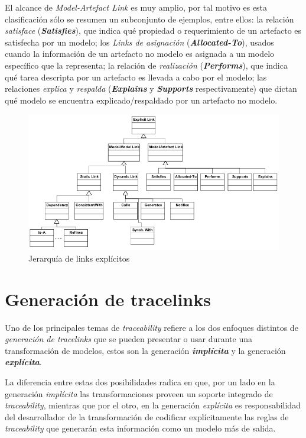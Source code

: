 \documentclass[a4paper,12pt,oneside,spanish]{book}
\begin{document}
El alcance de \textit{Model-Artefact Link} es muy amplio, por tal motivo es esta clasificación sólo se resumen un subconjunto de ejemplos, entre ellos: la relación \textit{satisface} (\textit{\textbf{Satisfies}}), que indica qué propiedad o requerimiento de un artefacto es satisfecha por un modelo; los \textit{Links de asignación} (\textit{\textbf{Allocated-To}}), usados cuando la información de un artefacto no modelo es asignada a un modelo específico que la representa; la relación de \textit{realización} (\textit{\textbf{Performs}}), que indica qué tarea descripta por un artefacto es llevada a cabo por el modelo; las relaciones \textit{explica} y \textit{respalda} (\textit{\textbf{Explains}} y \textit{\textbf{Supports}} respectivamente) que dictan qué modelo se encuentra explicado/respaldado por un artefacto no modelo.

\begin{figure}[hbtp]
\centering
\includegraphics[scale=0.51]{./img/ExplicitTraceLinks}
\caption{Jerarquía de links explícitos}
\label{fig:LinksExplicitos}
\end{figure}




\section{Generación de tracelinks}
\label{sec:GeneracionTracelinks}

Uno de los principales temas de \textit{traceability} refiere a los dos enfoques distintos de \textit{generación de tracelinks} que se pueden presentar o usar durante una transformación de modelos, estos son la generación \textit{\textbf{implícita}} y la generación \textit{\textbf{explícita}}. 

La diferencia entre estas dos posibilidades radica en que, por un lado en la generación \textit{implícita} las transformaciones proveen un soporte integrado de \textit{traceability}, mientras que por el otro, en la generación \textit{explícita} es responsabilidad del desarrollador de la transformación de codificar explícitamente las reglas de \textit{traceability} que generarán esta información como un modelo más de salida.
\end{document}
